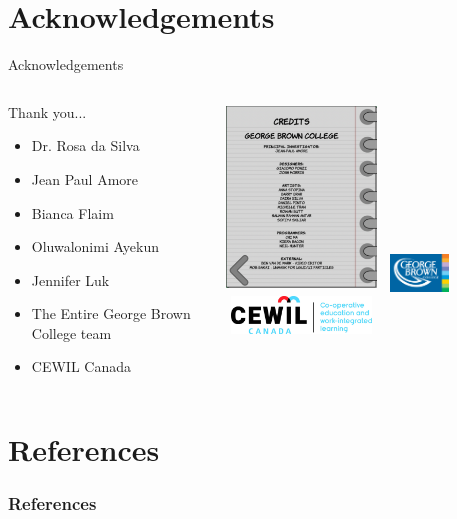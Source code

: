 \documentclass{beamer}
\begin{document}
	\section{Acknowledgements}
	\begin{frame}{Acknowledgements}
		\begin{columns}
			\begin{column}{0.45\textwidth}
				Thank you...
				\begin{itemize}
					\item Dr. Rosa da Silva
					\item Jean Paul Amore
					\item Bianca Flaim
					\item Oluwalonimi Ayekun
					\item Jennifer Luk
					\item The Entire George Brown College team
					\item CEWIL Canada	
				\end{itemize}
			\end{column}
			\begin{column}{0.5\textwidth}
				\centering
				\includegraphics[width=4cm, height=5cm]{credits.png}
				\includegraphics[width=2cm, height=1cm]{gbc.png}	
				\includegraphics[width=4cm, height=1cm]{cewil.jpg}
			\end{column}
		\end{columns}
	\end{frame}		
		
	\section{References}
	\begin{frame}[allowframebreaks]
		\frametitle{References}
		\nocite{*}
		\printbibliography[heading=none, sorting=nyt]
		\newpage
	\end{frame}
	
	
\end{document}
